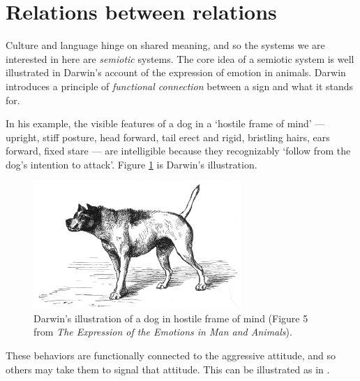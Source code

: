 

\section{Relations between relations}

Culture and language hinge on shared meaning, and so the systems we are interested in here are \textit{semiotic }systems. The core idea of a semiotic system 
is well illustrated in Darwin's account of the expression of emotion in 
animals. Darwin introduces a principle of \textit{functional connection 
}between a sign and what it stands for. 



In his example, the visible features of a dog in a \textquoteleft hostile frame of 
mind' --- upright, stiff posture, head forward, tail erect and rigid, 
bristling hairs, ears forward, fixed stare --- are intelligible because they 
recognizably \textquoteleft follow from the dog's intention to attack'. Figure \ref{darwin1} is 
Darwin's illustration.


\begin{figure}[p]
\includegraphics[width=0.70\textwidth,keepaspectratio]{figures/Fig01}
\caption{Darwin's illustration of a dog in hostile frame of mind 
(Figure 5 from \textit{The Expression of the Emotions in Man and 
Animals}).}
\label{darwin1}
\end{figure}



These behaviors are functionally connected to the aggressive attitude, 
and so others may take them to signal that attitude. This can be illustrated as in  .

